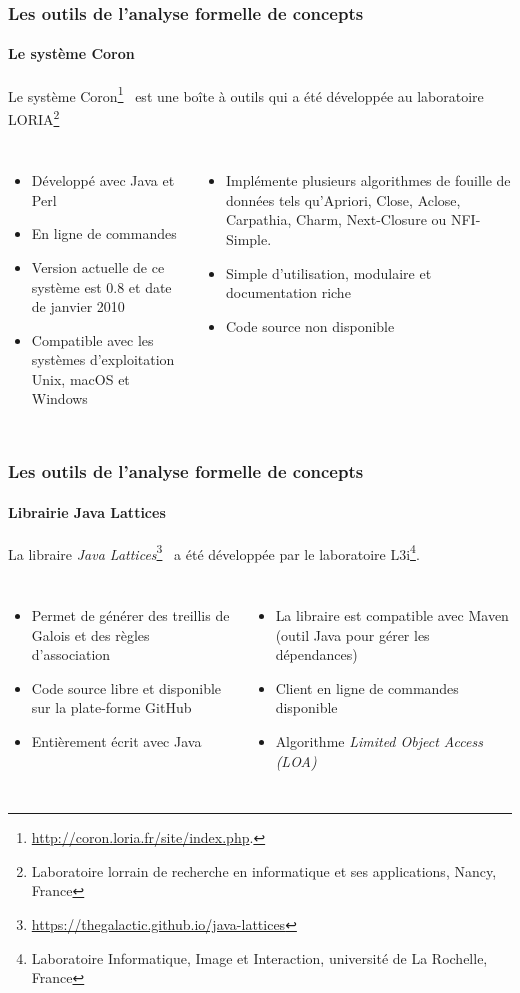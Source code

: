 \documentclass[french]{beamer}
\begin{document}
\begin{frame}
\frametitle{Les outils de l'analyse formelle de concepts}
\framesubtitle{Le système Coron}
Le système Coron\footnote{\url{http://coron.loria.fr/site/index.php}.}~\parencite{Szathmary2006} est une boîte à outils qui a été développée au laboratoire LORIA\footnote{Laboratoire lorrain de recherche en informatique et ses applications, Nancy, France} 
\begin{columns}[t]
\begin{itemize}
\item Développé avec Java et Perl
\item En ligne de commandes
\item Version actuelle de ce système est 0.8 et date de janvier 2010
\item Compatible avec les systèmes d'exploitation Unix, macOS et Windows
\end{itemize}
\begin{itemize}
\item Implémente plusieurs algorithmes de fouille de données tels qu'Apriori, Close, Aclose, Carpathia, Charm, Next-Closure ou NFI-Simple.
\item Simple d'utilisation, modulaire et documentation riche
\item Code source non disponible
\end{itemize}
\end{columns}
\end{frame}
\begin{frame}
\frametitle{Les outils de l'analyse formelle de concepts}
\framesubtitle{Librairie Java Lattices}
La libraire \textit{Java Lattices}\footnote{\url{https://thegalactic.github.io/java-lattices}}~\parencite{Bertet2014} a été développée par le laboratoire L3i\footnote{Laboratoire Informatique, Image et Interaction, université de La Rochelle, France}.
\begin{columns}[t]
\begin{itemize}
\item Permet de générer des treillis de Galois et des règles d'association
\item Code source libre et disponible sur la plate-forme GitHub
\item Entièrement écrit avec Java
\end{itemize}
\begin{itemize}
\item La libraire est compatible avec Maven (outil Java pour gérer les dépendances)
\item Client en ligne de commandes disponible
\item Algorithme \emph{Limited Object Access (LOA)}~\parencite{Demko2011}
\end{itemize}
\end{columns}
\end{frame}
\end{document}
